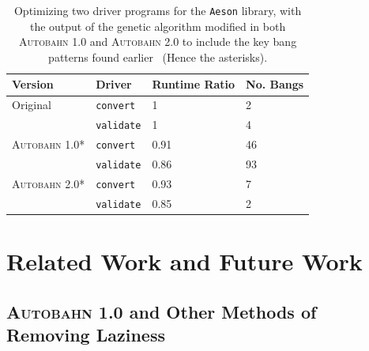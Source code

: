 \documentclass[format=sigplan, review=true]{acmart}
\newcommand{\Ao}[0]{\textsc{Autobahn 1.0}}
\newcommand{\At}[0]{\textsc{Autobahn 2.0}}
\newcommand{\preopt}[0]{pre-search}
\begin{document}
{%



\begin{table}
\begin{tabular}{p{2.5cm}p{1.5cm}p{1.5cm}p{1.5cm}}
\hline
Version   & Driver & Runtime Ratio & No. Bangs\\
\hline
Original      & \texttt{convert}   & 1     &  2\\
              & \texttt{validate}  & 1     &  4\\
\Ao{}*        & \texttt{convert}   & 0.91  & 46\\
              & \texttt{validate}  & 0.86  & 93\\
\At{}*        & \texttt{convert}   & 0.93  &  7\\
              & \texttt{validate}  & 0.85  &  2\\
\hline
\end{tabular}
\caption{Optimizing two driver programs for
the \texttt{Aeson} library, with the output of the genetic algorithm 
modified in both \Ao{} and \At{} to include the key bang patterns
found earlier~\cite{autobahn-wang} (Hence the asterisks).} 
\label{tab:aeson}
\end{table}
}

\section{Related Work and Future Work}

\subsection{\Ao{} and Other Methods of Removing Laziness}
\end{document}
